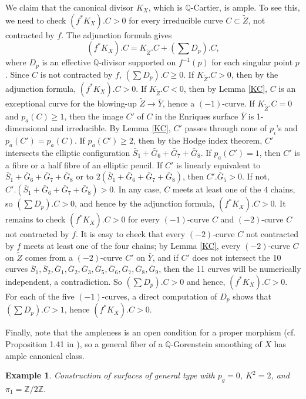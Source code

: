 \documentclass[twoside,11pt]{amsart}
\newtheorem{example}{Example}[section]
\begin{document}
We claim that the canonical divisor $K_X$, which is ${{\mathbb Q}}$-Cartier,
is ample. To see this, we need to check $(f^*K_X).C>0$ for every
irreducible curve $C\subset\tilde Z$, not contracted by $f$. The
adjunction formula gives
$$(f^*K_X).C=K_{\tilde Z}.C+(\sum D_p).C,$$ where $D_p$ is an effective
${{\mathbb Q}}$-divisor supported on $f^{-1}(p)$ for each singular point
$p$.  Since $C$ is not contracted by $f$, $(\sum D_p).C\ge 0$. If
$K_{\tilde Z}.C>0$, then by the adjunction formula,
$(f^*K_X).C>0$. If $K_{\tilde Z}.C<0$, then by Lemma \ref{KC}, $C$
is an exceptional curve for the blowing-up ${\tilde Z}\to
\bar{Y}$, hence a $(-1)$-curve. If $K_{\tilde Z}.C=0$ and
$p_a(C)\ge 1$, then the image $C'$ of $C$ in the Enriques surface
$\bar{Y}$ is 1-dimensional and irreducible. By Lemma \ref{KC},
$C'$ passes through none of $p_i$'s and $p_a(C')=p_a(C)$. If
$p_a(C')\ge 2$, then by the Hodge index theorem, $C'$ intersects
the elliptic configuration $\bar S_1+\bar G_6+\bar G_7+\bar G_8$.
If $p_a(C')=1$, then $C'$ is a fibre or a half fibre of an
elliptic pencil. If $C'$ is linearly equivalent to $\bar S_1+\bar
G_6+\bar G_7+\bar G_8$ or to $2(\bar S_1+\bar G_6+\bar G_7+\bar
G_8)$, then $C'.\bar G_5>0$. If not, $C'.(\bar S_1+\bar G_6+\bar
G_7+\bar G_8)>0$. In any case, $C$ meets at least one of the 4
chains, so $(\sum D_p).C>0$, and hence by the adjunction formula,
$(f^*K_X).C>0$. It remains to check $(f^*K_X).C>0$ for every
$(-1)$-curve $C$ and $(-2)$-curve $C$ not contracted by $f$. It is
easy to check that every $(-2)$-curve $C$ not contracted by $f$
meets at least one of the four chains; by Lemma \ref{KC}, every
$(-2)$-curve $C$ on $\tilde Z$ comes from a $(-2)$-curve $C'$ on
$\bar Y$, and if $C'$ does not intersect the 10 curves $\bar S_1,
\bar S_2, \bar G_1, \bar G_2, \bar G_3, \bar G_5, \bar G_6, \bar
G_7, \bar G_8, \bar G_9$, then the 11 curves will be numerically
independent, a contradiction. So $(\sum D_p).C>0$ and hence,
$(f^*K_X).C>0$. For each of the five $(-1)$-curves, a direct
computation of $D_p$ shows that $(\sum D_p).C>1$, hence
$(f^*K_X).C>0$.

Finally, note that the ampleness is an open condition for a proper
morphism (cf. Proposition 1.41 in \cite{KM}), so a general fiber
of a ${{\mathbb Q}}$-Gorenstein smoothing of $X$ has ample canonical class.

\begin{example} Construction of surfaces of general type with $p_g=0$, $K^2=2$,
and $\pi_1={{\mathbb Z}}/2{{\mathbb Z}}$. \end{example}
\end{document}
